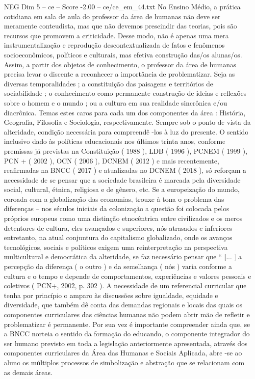 \begin{textsample}{NEG Dim 5 – ce – Score -2.00 – ce/ce\_em\_44.txt}
No Ensino Médio, a prática cotidiana em sala de aula do professor da área de humanas não deve ser meramente conteudista, mas que não devemos prescindir das teorias, pois são recursos que promovem a criticidade.
Desse modo, não é apenas uma mera instrumentalização e reprodução descontextualizada de fatos e fenômenos socioeconômicos, políticos e culturais, mas efetiva construção das/os alunas/os.
Assim, a partir dos objetos de conhecimento, o professor da área de humanas precisa levar o discente a reconhecer a importância de problematizar.
Seja as diversas temporalidades ; a constituição das paisagens e territórios de sociabilidade ; o conhecimento como permanente construção de ideias e reflexões sobre o homem e o mundo ; ou a cultura em sua realidade sincrônica e/ou diacrônica.
Temas estes caros para cada um dos componentes da área : História, Geografia, Filosofia e Sociologia, respectivamente.
Sempre sob o ponto de vista da alteridade, condição necessária para compreendê -los à luz do presente.
O sentido inclusivo dado às políticas educacionais nos últimos trinta anos, conforme premissas já previstas na Constituição ( 1988 ), LDB ( 1996 ), PCNEM ( 1999 ), PCN + ( 2002 ), OCN ( 2006 ), DCNEM ( 2012 ) e mais recentemente, reafirmadas na BNCC ( 2017 ) e atualizadas no DCNEM ( 2018 ), só reforçam a necessidade de se pensar que a sociedade brasileira é marcada pela diversidade social, cultural, étnica, religiosa e de gênero, etc.
Se a europeização do mundo, coroada com a globalização das economias, trouxe à tona o problema das diferenças – nos séculos iniciais da colonização a questão foi colocada pelos próprios europeus como uma distinção etnocêntrica entre civilizados e os meros detentores de cultura, eles avançados e superiores, nós atrasados e inferiores – entretanto, na atual conjuntura do capitalismo globalizado, onde os avanços tecnológicos, sociais e políticos exigem uma reinterpretação na perspectiva multicultural e democrática da alteridade, se faz necessário pensar que “ [... ] a percepção da diferença ( o outro ) e da semelhança ( nós ) varia conforme a cultura e o tempo e depende de comportamentos, experiências e valores pessoais e coletivos ( PCN+, 2002, p. 302 ).
A necessidade de um referencial curricular que tenha por princípio o amparo às discussões sobre igualdade, equidade e diversidade, que também dê conta das demandas regionais e locais das quais os componentes curriculares das ciências humanas não podem abrir mão de refletir e problematizar é permanente.
Por sua vez é importante compreender ainda que, se a BNCC norteia o sentido da formação do educando, o componente integrador do ser humano previsto em toda a legislação anteriormente apresentada, através dos componentes curriculares da Área das Humanas e Sociais Aplicada, abre -se ao aluno os múltiplos processos de simbolização e abstração que se relacionam com as demais áreas.

\end{textsample}
